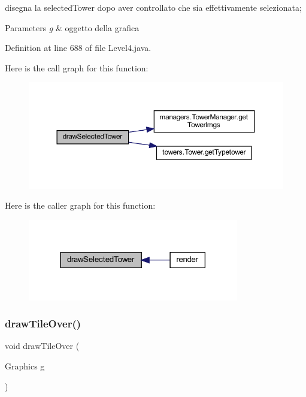 disegna la selected\+Tower dopo aver controllato che sia effettivamente selezionata; 


\begin{DoxyParams}{Parameters}
{\em g} & oggetto della grafica \\
\hline
\end{DoxyParams}


Definition at line 688 of file Level4.\+java.

Here is the call graph for this function\+:\nopagebreak
\begin{figure}[H]
\begin{center}
\leavevmode
\includegraphics[width=350pt]{classscenes_1_1_level4_a0a97d0bb6d32640b2ae351707946abf7_cgraph}
\end{center}
\end{figure}
Here is the caller graph for this function\+:\nopagebreak
\begin{figure}[H]
\begin{center}
\leavevmode
\includegraphics[width=261pt]{classscenes_1_1_level4_a0a97d0bb6d32640b2ae351707946abf7_icgraph}
\end{center}
\end{figure}
\mbox{\label{classscenes_1_1_level4_ac299bbbbb70f97ae032c1345d5937378}} 
\subsubsection{\texorpdfstring{draw\+Tile\+Over()}{drawTileOver()}}
{\footnotesize\ttfamily void draw\+Tile\+Over (\begin{DoxyParamCaption}\item[{Graphics}]{g }\end{DoxyParamCaption})\hspace{0.3cm}{\ttfamily [private]}}



